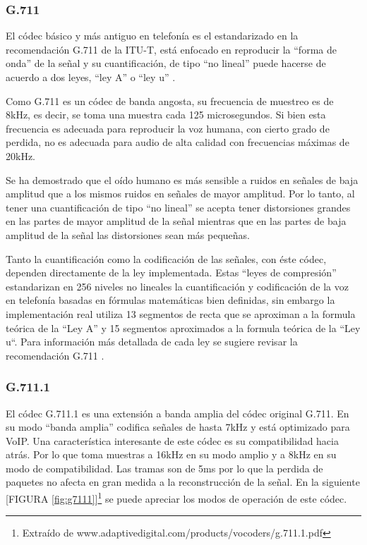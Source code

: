 
\subsubsection{G.711}

El códec básico y más antiguo en telefonía es el estandarizado en la recomendación G.711 de la ITU-T, está enfocado en reproducir la “forma de onda” de la señal y su cuantificación, de tipo “no lineal” puede hacerse de acuerdo a dos leyes, “ley A” o “ley u” \cite{g711}. 

Como G.711 es un códec de banda angosta, su frecuencia de muestreo es de 8kHz, es decir, se toma una muestra cada 125 microsegundos. Si bien esta frecuencia es adecuada para reproducir la voz humana, con cierto grado de perdida, no es adecuada para audio de alta calidad con frecuencias máximas de 20kHz.

Se ha demostrado que el oído humano es más sensible a ruidos en señales de baja amplitud que a los mismos ruidos en señales de mayor amplitud. Por lo tanto, al tener una cuantificación de tipo “no lineal” se acepta tener distorsiones grandes en las partes de mayor amplitud de la señal mientras que en las partes de baja amplitud de la señal las distorsiones sean más pequeñas. 

Tanto la cuantificación como la codificación de las señales, con éste códec, dependen directamente de la ley implementada. Estas “leyes de compresión” estandarizan en 256 niveles no lineales la cuantificación y codificación de la voz en telefonía basadas en fórmulas matemáticas bien definidas, sin embargo la implementación real utiliza 13 segmentos de recta que se aproximan a la formula teórica de la “Ley A” y 15 segmentos aproximados a la formula teórica de la “Ley u“. Para información más detallada de cada ley se sugiere revisar la recomendación G.711 \cite{g711}.

\subsubsection{G.711.1}

El códec G.711.1 es una extensión a banda amplia del códec original G.711. En su modo “banda amplia” codifica señales de hasta 7kHz y está optimizado para VoIP. Una característica interesante de este códec es su compatibilidad hacia atrás. Por lo que toma muestras a 16kHz en su modo amplio y a 8kHz en su modo de compatibilidad. Las tramas son de 5ms por lo que la perdida de paquetes no afecta en gran medida a la reconstrucción de la señal. En la siguiente [FIGURA \ref{fig:g7111}]\footnote{Extraído de www.adaptivedigital.com/products/vocoders/g.711.1.pdf} se puede apreciar los modos de operación de este códec.

